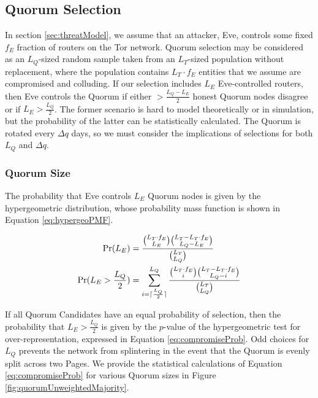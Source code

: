 \documentclass[conference]{IEEEtran}
\DeclarePairedDelimiter{\ceil}{\lceil}{\rceil}
\begin{document}
\subsection{Quorum Selection}
\label{sec:QSelection}

In section \ref{sec:threatModel}, we assume that an attacker, Eve, controls some fixed $ f_{E} $ fraction of routers on the Tor network. Quorum selection may be considered as an $ L_{Q} $-sized random sample taken from an $ L_{T} $-sized population without replacement, where the population contains $ L_{T} \cdot f_{E} $ entities that we assume are compromised and colluding. If our selection includes $ L_{E} $ Eve-controlled routers, then Eve controls the Quorum if either $ > \frac{L_{Q} - L_{E}}{2} $ honest Quorum nodes disagree or if $ L_{E} > \frac{L_{Q}}{2} $. The former scenario is hard to model theoretically or in simulation, but the probability of the latter can be statistically calculated. The Quorum is rotated every $ \Delta q $ days, so we must consider the implications of selections for both $ L_{Q} $ and $ \Delta q $.

\subsubsection{Quorum Size}
\label{sec:qSize}

The probability that Eve controls $ L_{E} $ Quorum nodes is given by the hypergeometric distribution, whose probability mass function is shown in Equation \ref{eq:hypergeoPMF}.

\begin{align}
	\mathrm{Pr}(L_{E}) &= \frac{\binom{L_{T} \cdot f_{E}}{L_{E}}\binom{L_{T} - L_{T} \cdot f_{E}}{L_{Q} - L_{E}}}{\binom{L_{T}}{L_{Q}}}
	\label{eq:hypergeoPMF}
	\\
	\mathrm{Pr}(L_{E} > \frac{L_{Q}}{2}) &= \displaystyle\sum_{i=\ceil{\frac{L_{Q}}{2}}}^{L_{Q}} \frac{\binom{L_{T} \cdot f_{E}}{i}\binom{L_{T} - L_{T} \cdot f_{E}}{L_{Q} - i}}{\binom{L_{T}}{L_{Q}}}
	\label{eq:compromiseProb}
\end{align}

If all Quorum Candidates have an equal probability of selection, then the probability that $ L_{E} > \frac{L_{Q}}{2} $ is given by the $p$-value of the hypergeometric test for over-representation, expressed in Equation \ref{eq:compromiseProb}. Odd choices for $ L_{Q} $ prevents the network from splintering in the event that the Quorum is evenly split across two Pages. We provide the statistical calculations of Equation \ref{eq:compromiseProb} for various Quorum sizes in Figure \ref{fig:quorumUnweightedMajority}.
\end{document}
